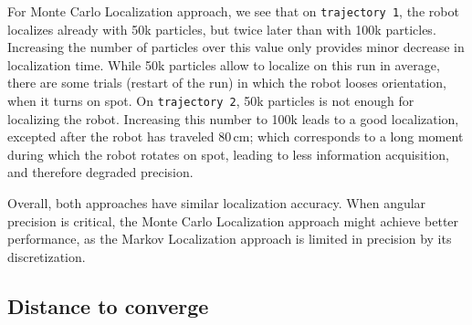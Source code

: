 \documentclass[letterpaper, 10pt, conference]{ieeeconf}
\begin{document}
For Monte Carlo Localization approach, we see that on \texttt{trajectory~1}, the robot localizes already with 50k particles, but twice later than with 100k particles.
Increasing the number of particles over this value only provides minor decrease in localization time.
While 50k particles allow to localize on this run in average, there are some trials (restart of the run) in which the robot looses orientation, when it turns on spot.
On \texttt{trajectory~2}, 50k particles is not enough for localizing the robot.
Increasing this number to 100k leads to a good localization, excepted after the robot has traveled 80\,cm; which corresponds to a long moment during which the robot rotates on spot, leading to less information acquisition, and therefore degraded precision.

Overall, both approaches have similar localization accuracy.
When angular precision is critical, the Monte Carlo Localization approach might achieve better performance, as the Markov Localization approach is limited in precision by its discretization.


\subsection{Distance to converge}
\end{document}
